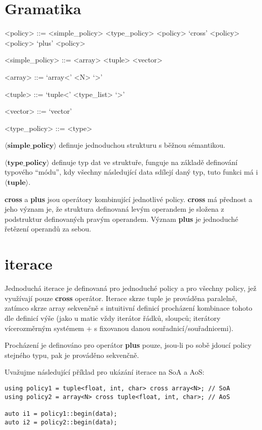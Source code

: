 \documentclass[a4paper,12pt]{article}
\begin{document}
    \section{Gramatika}

    \begin{grammar}
        <policy> ::= <simple_policy>
        \alt <type_policy>
        \alt <policy> `cross' <policy>
        \alt <policy> `plus' <policy>

        <simple_policy> ::= <array>
        \alt <tuple>
        \alt <vector>

        <array> ::= `array<' <N> `>'

        <tuple> ::= `tuple<' <type_list> `>'

        <vector> ::= `vector'

        <type_policy> ::= <type>
    \end{grammar}

    $\mathbf{\langle simple\_policy \rangle}$ definuje jednoduchou strukturu s běžnou sémantikou.

    $\mathbf{\langle type\_policy \rangle}$ definuje typ dat ve struktuře, funguje na základě definování typového ``módu'', kdy všechny následující data sdílejí daný typ, tuto funkci má i $\mathbf{\langle tuple \rangle}$.

    \textbf{cross} a \textbf{plus} jsou operátory kombinující jednotlivé policy.
    \textbf{cross} má přednost a jeho význam je, že struktura definovaná levým operandem je složena z podstruktur definovaných pravým operandem. Význam \textbf{plus} je jednoduché řetězení operandů za sebou.

    \section{iterace}

    Jednoduchá iterace je definovaná pro jednoduché policy a pro všechny policy, jež využívají pouze \textbf{cross} operátor. Iterace skrze tuple je prováděna paralelně, zatímco skrze array sekvenčně s intuitivní definicí procházení kombinace tohoto dle definicí výše (jako u matic vždy iterátor řádků, sloupců; iterátory vícerozměrným systémem + s fixovanou danou souřadnicí/souřadnicemi).

    Procházení je definováno pro operátor \textbf{plus} pouze, jsou-li po sobě jdoucí policy stejného typu, pak je prováděno sekvenčně.

    Uvažujme následující příklad pro ukázání iterace na SoA a AoS:
    \begin{lstlisting}
using policy1 = tuple<float, int, char> cross array<N>; // SoA
using policy2 = array<N> cross tuple<float, int, char>; // AoS

auto i1 = policy1::begin(data);
auto i2 = policy2::begin(data);
    \end{lstlisting}
\end{document}
